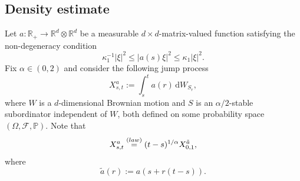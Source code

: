 \documentclass[11pt]{article}
\numberwithin{equation}{section}\providecommand{\asymp}{\mathrel{\sim}}
\theoremstyle{plain}
\theoremstyle{definition}
\newcommand\mR{\mathbb{R}}
\newcommand\1{{\mathbf{1}}}
\newcommand{\dif}{\,\mathrm{d}}
\begin{document}
\subsection{Density estimate }
\label{SEC_DENS_EST}
Let $a:\mR_+\to\mR^d\otimes\mR^d$ be a measurable $d\times d$-matrix-valued function satisfying
the non-degeneracy condition
\begin{equation}\label{AA4}
\kappa_1^{-1}|\xi|^2\leq |a(s)\xi|^2\leq \kappa_1|\xi|^2.
\end{equation}
Fix $\alpha\in (0,2)$ and consider the following jump process
\begin{equation}\label{SUB_INTEGRAL}
X^a_{s,t}:=\int^t_sa(r)\dif W_{S_r},
\end{equation}
where $ W$ is a $d$-dimensional Brownian motion and $S$ is an $\alpha/2$-stable subordinator independent of $W$, both defined on some probability space $(\Omega,\mathcal F,\mathbb P) $. Note that
\[
X^a_{s,t}\stackrel{\textup{(law)}}{=}(t-s)^{1/\alpha}X^{\tilde a}_{0,1},
\]
where
\[
\tilde a(r):=a(s+r(t-s)).
\]
\end{document}
